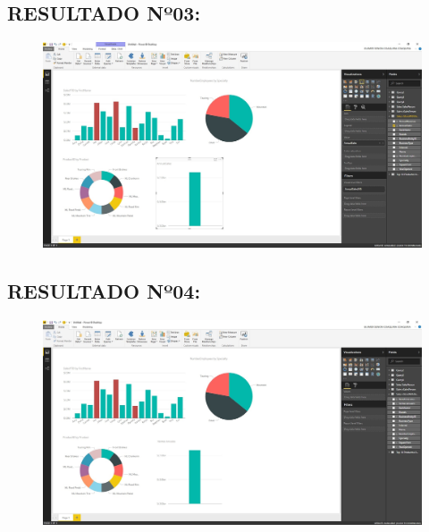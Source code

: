 \subsection{RESULTADO Nº03:}
\begin{figure}[httb]
\begin{center}
\includegraphics[width=15cm]{./Imagenes/Captura03}
\end{center}
\end{figure}

\subsection{RESULTADO Nº04:}
\begin{figure}[httb]
\begin{center}
\includegraphics[width=15cm]{./Imagenes/Captura04}
\end{center}
\end{figure}
\newpage
